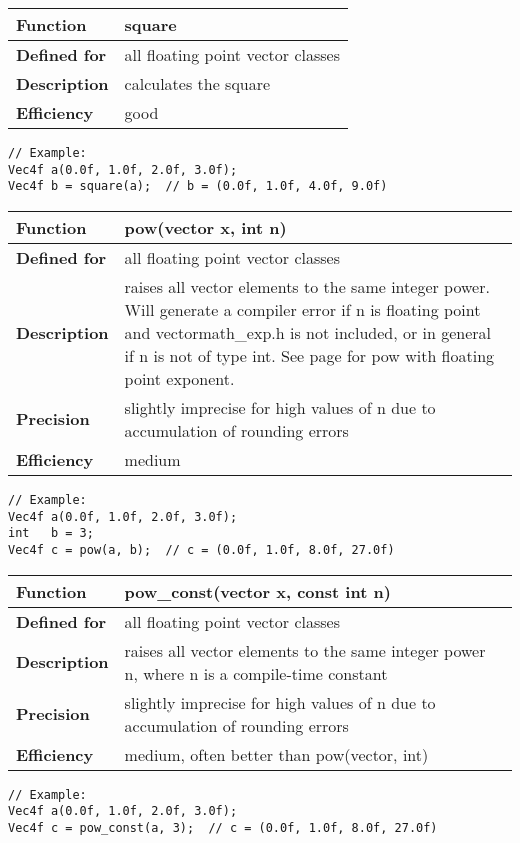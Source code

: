 \documentclass[vcl_manual.tex]{subfiles}
\begin{document}
\begin{tabular}{|p{25mm}|p{100mm}|}
\hline
\bfseries Function & square \\ \hline
\bfseries Defined for & all floating point vector classes \\ \hline
\bfseries Description & calculates the square \\ \hline
\bfseries Efficiency & good \\ \hline
\end{tabular}
\begin{lstlisting}[frame=none]
// Example:
Vec4f a(0.0f, 1.0f, 2.0f, 3.0f);
Vec4f b = square(a);  // b = (0.0f, 1.0f, 4.0f, 9.0f)
\end{lstlisting}


\label{powVectorInt}
\begin{tabular}{|p{25mm}|p{100mm}|}
\hline
\bfseries Function & pow(vector x, int n) \\ \hline
\bfseries Defined for & all floating point vector classes \\ \hline
\bfseries Description & raises all vector elements to the same integer power. 
Will generate a compiler error if n is floating point and vectormath\_exp.h is not included, or in general if n is not of type int.
See page \pageref{ExpLogFunctions} for pow with floating point exponent.
 \\ \hline
\bfseries Precision & slightly imprecise for high values of n due to accumulation of rounding errors \\ \hline
\bfseries Efficiency & medium \\ \hline
\end{tabular}
\begin{lstlisting}[frame=none]
// Example:
Vec4f a(0.0f, 1.0f, 2.0f, 3.0f);
int   b = 3;
Vec4f c = pow(a, b);  // c = (0.0f, 1.0f, 8.0f, 27.0f)
\end{lstlisting}


\label{powConstVectorInt}
\begin{tabular}{|p{25mm}|p{100mm}|}
\hline
\bfseries Function & pow\_const(vector x, const int n) \\ \hline
\bfseries Defined for & all floating point vector classes \\ \hline
\bfseries Description & raises all vector elements to the same integer power n, where n is a compile-time constant \\ \hline
\bfseries Precision & slightly imprecise for high values of n due to accumulation of rounding errors \\ \hline
\bfseries Efficiency & medium, often better than pow(vector, int) \\ \hline
\end{tabular}
\begin{lstlisting}[frame=none]
// Example:
Vec4f a(0.0f, 1.0f, 2.0f, 3.0f);
Vec4f c = pow_const(a, 3);  // c = (0.0f, 1.0f, 8.0f, 27.0f)
\end{lstlisting}
\end{document}
